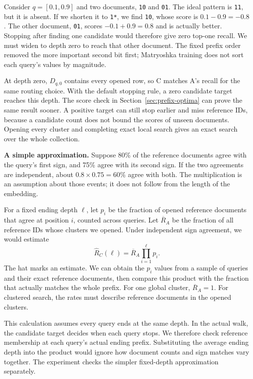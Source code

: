 Consider $q=[0.1,0.9]$ and two documents, \texttt{10} and \texttt{01}. The ideal pattern is \texttt{11}, but it is absent. If we shorten it to \texttt{1*}, we find \texttt{10}, whose score is $0.1-0.9=-0.8$. The other document, \texttt{01}, scores $-0.1+0.9=0.8$ and is actually better. Stopping after finding one candidate would therefore give zero top-one recall. We must widen to depth zero to reach that other document. The fixed prefix order removed the more important second bit first; Matryoshka training does not sort each query's values by magnitude.

At depth zero, $D_{q,0}$ contains every opened row, so C matches A's recall for the same routing choice. With the default stopping rule, a zero candidate target reaches this depth. The score check in Section~\ref{sec:prefix-optima} can prove the same result sooner. A positive target can still stop earlier and miss reference IDs, because a candidate count does not bound the scores of unseen documents. Opening every cluster and completing exact local search gives an exact search over the whole collection.

\textbf{A simple approximation.} Suppose 80\% of the reference documents agree with the query's first sign, and 75\% agree with its second sign. If the two agreements are independent, about $0.8\times0.75=60\%$ agree with both. The multiplication is an assumption about those events; it does not follow from the length of the embedding.

For a fixed ending depth $\ell$, let $p_i$ be the fraction of opened reference documents that agree at position $i$, counted across queries. Let $\overline R_A$ be the fraction of all reference IDs whose clusters we opened. Under independent sign agreement, we would estimate
\[
 \widehat R_C(\ell)=\overline R_A\prod_{i=1}^{\ell}p_i.
\]
The hat marks an estimate. We can obtain the $p_i$ values from a sample of queries and their exact reference documents, then compare this product with the fraction that actually matches the whole prefix. For one global cluster, $\overline R_A=1$. For clustered search, the rates must describe reference documents in the opened clusters.

This calculation assumes every query ends at the same depth. In the actual walk, the candidate target decides when each query stops. We therefore check reference membership at each query's actual ending prefix. Substituting the average ending depth into the product would ignore how document counts and sign matches vary together. The experiment checks the simpler fixed-depth approximation separately.

